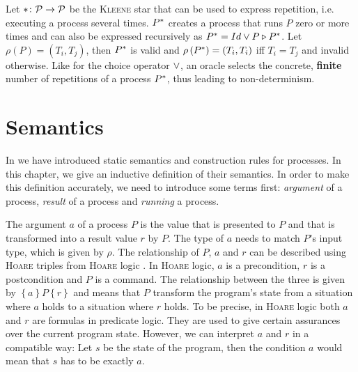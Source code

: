 \begin{definition}
\label{def:static_kleene}
Let $* \colon \mathcal{P} \to \mathcal{P}$ be the \textsc{Kleene} star that can be used to express repetition, i.e. executing a process several times. $P^*$ creates a process that runs $P$ zero or more times and can also be expressed recursively as $P^* = Id \vee P \triangleright P^*$. Let $\rho \left( P \right) = \left( T_i, T_j \right)$, then $P^*$ is valid and $\rho \left( P^* \right) = \left( T_i, T_i \right)$ iff $T_i = T_j$ and invalid otherwise. Like for the choice operator $\vee$, an oracle selects the concrete, \textbf{finite} number of repetitions of a process $P^*$, thus leading to non-determinism.

\hfill\qedsymbol
\end{definition}




\section{Semantics}
\label{chp:semantics}
In  we have introduced static semantics and construction rules for processes. In this chapter, we give an inductive definition of their semantics. In order to make this definition accurately, we need to introduce some terms first: \textit{argument} of a process, \textit{result} of a process and \textit{running} a process.

The argument $a$ of a process $P$ is the value that is presented to $P$ and that is transformed into a result value $r$ by $P$. The type of $a$ needs to match $P$'s input type, which is given by $\rho$. The relationship of $P$, $a$ and $r$ can be described using \textsc{Hoare} triples from \textsc{Hoare} logic \cite{}. In \textsc{Hoare} logic, $a$ is a precondition, $r$ is a postcondition and $P$ is a command. The relationship between the three is given by $\left\{ a \right\} P \left\{ r \right\}$ and means that $P$ transform the program's state from a situation where $a$ holds to a situation where $r$ holds. To be precise, in \textsc{Hoare} logic both $a$ and $r$ are formulas in predicate logic. They are used to give certain assurances over the current program state. However, we can interpret $a$ and $r$ in a compatible way: Let $s$ be the state of the program, then the condition $a$ would mean that $s$ has to be exactly $a$.

